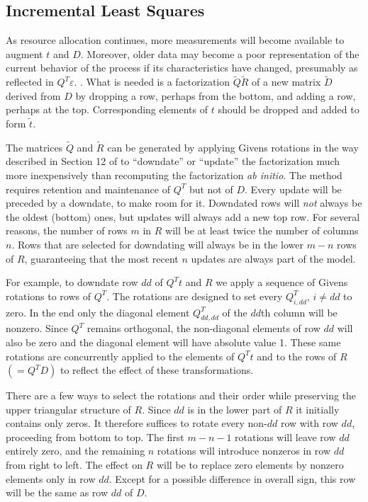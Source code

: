 \subsection*{Incremental Least Squares}

As resource allocation continues, more measurements will become available to augment $t$ and $D$.
Moreover, older data may become a poor representation of the current behavior of the process if its characteristics have changed, presumably as reflected in $Q^T\varepsilon$. .
What is needed is a factorization $\tilde{Q}\tilde{R}$ of a new matrix $\tilde{D}$
derived from $D$ by dropping a row, perhaps from the bottom,
and adding a row, perhaps at the top.
Corresponding elements of $t$ should be dropped and added to form $\tilde{t}$.

The matrices $\tilde{Q}$ and $\tilde{R}$ can be generated by applying Givens rotations
in the way described in Section 12 of \cite{GV} to “downdate” or “update” the factorization
much more inexpensively than recomputing the factorization \emph{ab initio}.
The method requires retention and maintenance of $Q^T$ but not of $D$.
Every update will be preceded by a downdate, to make room for it.
Downdated rows will \emph{not} always be the oldest (bottom) ones, but
updates will always add a new top row.
For several reasons, the number of rows $m$ in $R$
will be at least twice the number of columns $n$.
Rows that are selected for downdating will always be in the lower $m - n$ rows of $R$,
guaranteeing that the most recent $n$ updates are always part of the model.

For example, to downdate row $dd$ of $Q^Tt$ and $R$ we apply
a sequence of Givens rotations to rows of $Q^T$.
The rotations are designed to set every $Q^T_{i,dd}$, $i \neq dd$ to zero.
In the end only the diagonal element $Q^T_{dd,dd}$ of the $dd$th column will be nonzero.
Since $Q^T$ remains orthogonal, the non-diagonal elements of row $dd$ will also be zero
and the diagonal element will have absolute value 1.
These same rotations are concurrently applied to the elements of $Q^T t$ and to the rows of $R$ $(= Q^T D)$
to reflect the effect of these transformations.

There are a few ways to select the rotations and their order
while preserving the upper triangular structure of $R$.
Since $dd$ is in the lower part of $R$ it initially contains only zeros.
It therefore suffices to rotate every non-$dd$ row with row $dd$, proceeding from bottom to top.
The first $m - n - 1$ rotations will leave row $dd$ entirely zero,
and the remaining $n$ rotations will introduce nonzeros in row $dd$ from right to left.
The effect on $R$ will be to replace zero elements by nonzero elements only in row $dd$.
Except for a possible difference in overall sign, this row will be the same as row $dd$ of $D$.


